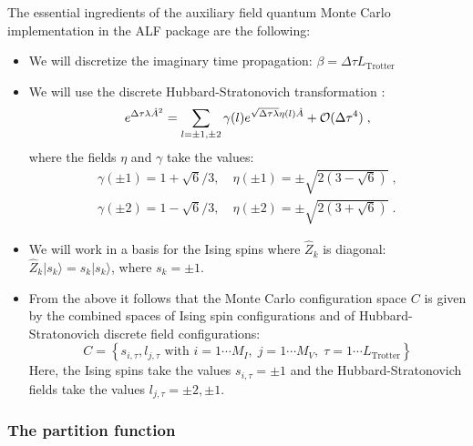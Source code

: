 The essential ingredients of the auxiliary field quantum Monte Carlo implementation in the ALF package are the following:
\begin{itemize}
\item  We will discretize the imaginary time propagation: $\beta = \Delta \tau L_{\text{Trotter}} $ \cite{Fye86}
\item  We will use  the   discrete Hubbard-Stratonovich transformation \cite{Motome97,Assaad97}:
\begin{equation}
\label{HS_squares}
        e^{\Delta \tau  \lambda  \hat{A}^2 } =
        \sum_{ l = \pm 1, \pm 2}  \gamma(l)
e^{ \sqrt{\Delta \tau \lambda }
       \eta(l)  \hat{A} }
                + {\cal O} (\Delta \tau ^4)\;,
\end{equation}
where the fields $\eta$ and $\gamma$ take the values:
\begin{eqnarray}
 \gamma(\pm 1)  = 1 + \sqrt{6}/3, \quad  \eta(\pm 1 ) = \pm \sqrt{2 \left(3 - \sqrt{6} \right)}\;,\\\nonumber
  \gamma(\pm 2) = 1 - \sqrt{6}/3, \quad  \eta(\pm 2 ) = \pm \sqrt{2 \left(3 + \sqrt{6} \right)}\;.
\nonumber
\end{eqnarray}
\item  We will work in  a basis for the Ising spins  where  $\hat{Z}_k$ is diagonal: $\hat{Z}_{k}|s_{k}\rangle = s_{k}|s_{k}\rangle$, where $s_{k}=\pm 1$.
\item From the above it follows that the  Monte Carlo configuration space $C$  
is given by the combined spaces of Ising spin configurations  and of Hubbard-Stratonovich discrete field configurations:
\begin{equation}
	C = \left\{   s_{i,\tau} ,  l_{j,\tau}  \text{ with }  i=1\cdots M_I,\;  j = 1\cdots M_V,\; \tau=1\cdots L_{\mathrm{Trotter}}  \right\}
\end{equation}
Here, the Ising spins take the values  $s_{i,\tau} = \pm 1$ and  the Hubbard-Stratonovich fields take the values  $l_{j,\tau}  = \pm 2, \pm 1 $.
\end{itemize}

\subsubsection{The partition function}\label{sec:part}

